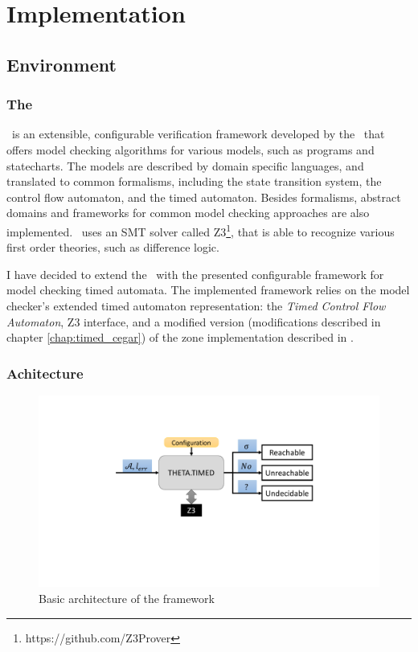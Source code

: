 \chapter{Implementation}\label{chap:impl}

\section{Environment}

\subsection{The \ttmcfw}

\ttmc\ is an extensible, configurable verification framework developed by the \bmemit\ that offers model checking algorithms for various models, such as programs and statecharts. The models are described by domain specific languages, and translated to common formalisms, including the state transition system, the control flow automaton, and the timed automaton. Besides formalisms, abstract domains and frameworks for common model checking approaches are also implemented. \ttmc\ uses an SMT solver called \textsc{Z3}\footnote{https://github.com/Z3Prover}, that is able to recognize various first order theories, such as difference logic.

I have decided to extend the \ttmcfw\ with the presented configurable framework for model checking timed automata. The implemented framework relies on the model checker's extended timed automaton representation: the \emph{Timed Control Flow Automaton}, Z3 interface, and a modified version (modifications described in chapter \ref{chap:timed_cegar}) of the zone implementation described in \cite{bengtsson2004timed}.

\subsection{Achitecture}

\begin{figure}
	\centering
	\includegraphics[width=.7\textwidth]{include/figures/architecture}
	\caption{Basic architecture of the framework}
	\label{fig:arc}
\end{figure}

